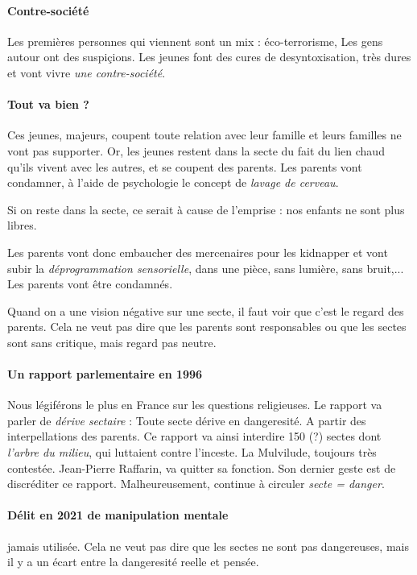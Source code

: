     \paragraph{Contre-société}
    Les premières personnes qui viennent sont un mix : éco-terrorisme, Les gens autour ont des suspiçions. Les jeunes font des cures de desyntoxisation, très dures et vont vivre \textit{une contre-société}. 
\paragraph{Tout va bien ? } Ces jeunes, majeurs, coupent toute relation avec leur famille et leurs familles ne vont pas supporter. Or, les jeunes restent dans la secte du fait du lien chaud qu'ils vivent avec les autres, et se coupent des parents. Les parents vont condamner, à l'aide de psychologie le concept de \textit{lavage de cerveau}. 
\begin{Def}
    Si on reste dans la secte, ce serait à cause de l'emprise : nos enfants ne sont plus libres. 
\end{Def}
Les parents vont donc embaucher des mercenaires pour les kidnapper et vont subir la \textit{déprogrammation sensorielle}, dans une pièce, sans lumière, sans bruit,...
Les parents vont être condamnés.
\begin{Prop}
    Quand on a une vision négative sur une secte, il faut voir que c'est le regard des parents. Cela ne veut pas dire que les parents sont responsables ou que les sectes sont sans critique, mais regard pas neutre.
\end{Prop}


\paragraph{Un rapport parlementaire en 1996 } Nous légiférons le plus en France sur les questions religieuses.
Le rapport va parler de \textit{dérive sectaire } : Toute secte dérive en dangeresité. A partir des interpellations des parents. Ce rapport va ainsi interdire 150 (?) sectes dont \textit{l'arbre du milieu}, qui luttaient contre l'inceste. La Mulvilude, toujours très contestée.
Jean-Pierre Raffarin, va quitter sa fonction. Son dernier geste est de discréditer ce rapport. Malheureusement, continue à circuler \textit{secte = danger}. 

\paragraph{Délit en 2021 de manipulation mentale} jamais utilisée. Cela ne veut pas dire que les sectes ne sont pas dangereuses, mais il y a un écart entre la dangeresité reelle et pensée.


